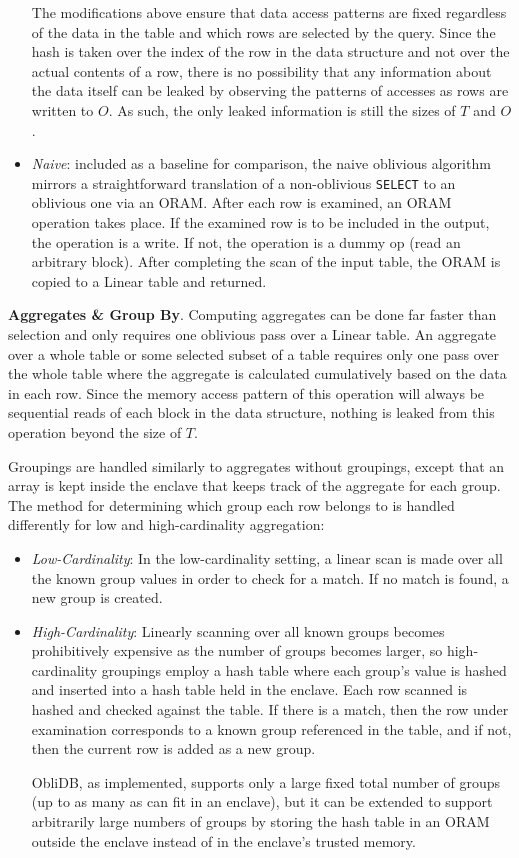 \documentclass[letterpaper,twocolumn,10pt]{article}
\def\name/{ObliDB}
\begin{document}
\begin{itemize}[itemsep=0pt,parsep=0pt]
The modifications above ensure that data access patterns are fixed regardless of the data in the table and which rows are selected by the query. Since the hash is taken over the index of the row in the data structure and not over the actual contents of a row, there is no possibility that any information about the data itself can be leaked by observing the patterns of accesses as rows are written to $O$. As such, the only leaked information is still the sizes of $T$ and $O$. 

\item \textit{Naive}: included as a baseline for comparison, the naive oblivious algorithm mirrors a straightforward translation of a non-oblivious \texttt{SELECT} to an oblivious one via an ORAM. After each row is examined, an ORAM operation takes place. If the examined row is to be included in the output, the operation is a write. If not, the operation is a dummy op (read an arbitrary block). After completing the scan of the input table, the ORAM is copied to a Linear table and returned.
\end{itemize}

  \noindent \textbf{Aggregates \& Group By}. 
Computing aggregates can be done far faster than selection and only requires one oblivious pass over a Linear table. An aggregate over a whole table or some selected subset of a table requires only one pass over the whole table where the aggregate is calculated cumulatively based on the data in each row. Since the memory access pattern of this operation will always be sequential reads of each block in the data structure, nothing is leaked from this operation beyond the size of $T$. 

Groupings are handled similarly to aggregates without groupings, except that an array is kept inside the enclave that keeps track of the aggregate for each group. The method for determining which group each row belongs to is handled differently for low and high-cardinality aggregation:
\begin{itemize}[itemsep=0pt,parsep=0pt]
\item \textit{Low-Cardinality}: In the low-cardinality setting, a linear scan is made over all the known group values in order to check for a match. If no match is found, a new group is created. 

\item \textit{High-Cardinality}: Linearly scanning over all known groups becomes prohibitively expensive as the number of groups becomes larger, so high-cardinality groupings employ a hash table where each group's value is hashed and inserted into a hash table held in the enclave. Each row scanned is hashed and checked against the table. If there is a match, then the row under examination corresponds to a known group referenced in the table, and if not, then the current row is added as a new group. 

\name/, as implemented, supports only a large fixed total number of groups (up to as many as can fit in an enclave), but it can be extended to support arbitrarily large numbers of groups by storing the hash table in an ORAM outside the enclave instead of in the enclave's trusted memory. 
\end{itemize}
\end{document}
